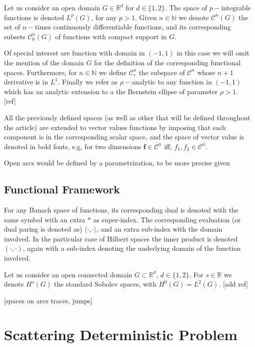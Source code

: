 \documentclass{article}
\newcommand{\todo}[1]{{\color{red}[#1]}}
\begin{document}
Let us consider an open domain $G \in \mathbb{R}^d$ for $d \in \{1,2\}$. The space of $p-$integrable functions is denoted $L^p(G)$, for any $p > 1$. Given  $n \in \mathbb{N}$ we denote $\mathcal{C}^n(G)$ the set of $n-$times continuously differentiable functions, and its corresponding subsets $\mathcal{C}^n_0(G)$ of functions with compact support in $G$. 

Of special interest are function with domain in $(-1,1)$ in this case we will omit the mention of the domain $G$ for the definition of the corresponding functional spaces. Furthermore, for $n \in \mathbb{N}$ we define $\mathcal{C}^n_v$ the subspace of $\mathcal{C}^n$ whose $n+1$ derivative is in $L^1$. Finally we refer as $\rho-$analytic to any function in $(-1,1)$ which has an analytic extension to a the Bernstein ellipse of parameter $\rho>1$. \todo{ref}

All the previously defined spaces (as well as other that will be defined throughout the article) are extended to vector values functions  by imposing that each component is in the corresponding scalar space, and the space of vector value is denoted in bold fonts, e.g, for two dimensions $\mathbf{f} \in \mathbf{\mathcal{C}}^n $ iff, $f_1, f_2 \in  \mathcal{C}^n$. 

Open arcs would be defined by a parametrization, to be more precise given 

\subsection{Functional Framework}

For any Banach space of functions, its corresponding dual is denoted with the same symbol with an extra $*$ as super-index. The corresponding evaluation (or dual paring is denoted as) $\langle \cdot , \cdot \rangle$, and an extra sub-index with the domain involved. In the particular case of Hilbert spaces the inner product is denoted $\left( \cdot, \cdot \right)$, again with a sub-index denoting the underlying domain of the function involved. 

Let us consider an open connected domain $G \subset \mathbb{R}^d$, $d \in \{1,2\}$. For $s \in \mathbb{R}$ we denote $H^s(G)$ the standard Sobolev spaces, with $H^0(G) = L^2(G)$. \todo{add ref} 

\todo{spaces on arcs  traces, jumps}



  

\section{Scattering Deterministic Problem}
\end{document}
